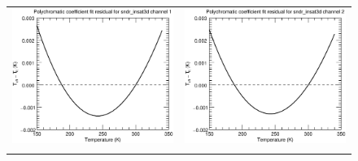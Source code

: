 \begin{figure}[H]
  \centering
  \begin{tabular}{c c}
    \includegraphics[scale=0.35]{graphics/sndr/tfit/sndr_insat3d-1.tfit.eps} &
    \includegraphics[scale=0.35]{graphics/sndr/tfit/sndr_insat3d-2.tfit.eps} \\\\

\end{tabular}
\end{figure}
